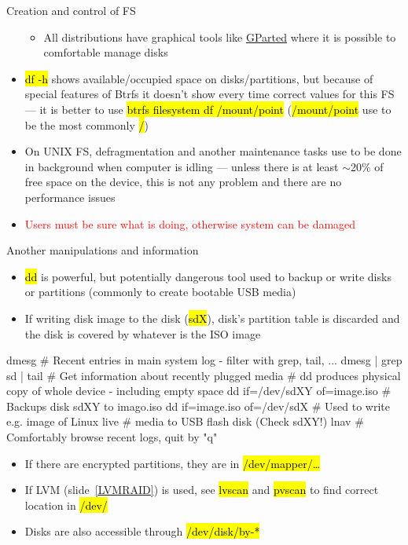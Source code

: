 \documentclass[compress, ucs, xelatex, 11pt, xcolor=svgnames,
  hyperref={
    bookmarks=true,
    unicode=true,
    colorlinks=true,
    pdftitle={Linux, command line and MetaCentrum},
    plainpages=false,
    pdfauthor={Vojtech Zeisek},
    pdfsubject={Course about use of Linux command line, writing shell scripts and using MetaCentrum of CESNET},
    pdfcreator={XeLaTeX},
    pdfkeywords={Linux, GNU, BASH, shell, command line, MetaCentrum},
    linkcolor=DarkRed,
    anchorcolor=DarkBlue,
    citecolor=Indigo,
    filecolor=NavyBlue,
    menucolor=DarkMagenta,
    urlcolor=DarkBlue,
    pdftex},
  url={hyphens, lowtilde} %
  ]{beamer}
\renewcommand{\texttt}[1]{\hl{\ttfamily #1}}
\renewcommand{\alert}[1]{\textcolor{red}{#1}}
\begin{document}
\begin{frame}[allowframebreaks]{Creation and control of FS}
\begin{itemize}
\begin{itemize}
      \item All distributions have graphical tools like \href{https://gparted.org/}{GParted} where it is possible to comfortable manage disks
    \end{itemize}
    \item \texttt{df -h} shows available/occupied space on disks/partitions, but because of special features of Btrfs it doesn't show every time correct values for this FS --- it is better to use \texttt{btrfs filesystem df /mount/point} (\texttt{/mount/point} use to be the most commonly \texttt{/})
    \item On UNIX FS, defragmentation and another maintenance tasks use to be done in background when computer is idling --- unless there is at least $\sim$20\% of free space on the device, this is not any problem and there are no performance issues
    \item \alert{Users must be sure what is doing, otherwise system can be damaged}
  \end{itemize}
\end{frame}

\begin{frame}[fragile]{Another manipulations and information}
  \begin{itemize}
    \item \texttt{dd} is powerful, but potentially dangerous tool used to backup or write disks or partitions (commonly to create bootable USB media)
    \item If writing disk image to the disk (\texttt{sdX}), disk's partition table is discarded and the disk is covered by whatever is the ISO image
  \end{itemize}
  \begin{bashcode}
    dmesg # Recent entries in main system log - filter with grep, tail, ...
    dmesg | grep sd | tail # Get information about recently plugged media
    # dd produces physical copy of whole device - including empty space
    dd if=/dev/sdXY of=image.iso # Backups disk sdXY to imago.iso
    dd if=image.iso of=/dev/sdX # Used to write e.g. image of Linux live
                                # media to USB flash disk (Check sdXY!)
    lnav # Comfortably browse recent logs, quit by "q"
  \end{bashcode}
  \begin{itemize}
    \item If there are encrypted partitions, they are in \texttt{/dev/mapper/\ldots}
    \item If LVM (slide~\ref{LVMRAID}) is used, see \texttt{lvscan} and \texttt{pvscan} to find correct location in \texttt{/dev/}
    \item Disks are also accessible through \texttt{/dev/disk/by-*}
  \end{itemize}
\end{frame}
\end{document}
